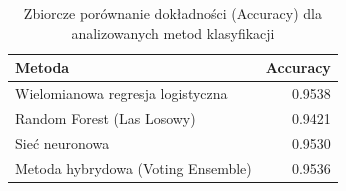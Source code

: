 \begin{table}[H]

\caption{\label{tab:comparison-accuracy}Zbiorcze porównanie dokładności (Accuracy) dla analizowanych metod klasyfikacji}
\centering
\begin{tabular}[t]{lr}
\toprule
Metoda & Accuracy\\
\midrule
Wielomianowa regresja logistyczna & 0.9538\\
Random Forest (Las Losowy) & 0.9421\\
Sieć neuronowa & 0.9530\\
Metoda hybrydowa (Voting Ensemble) & 0.9536\\
\bottomrule
\end{tabular}
\end{table}
